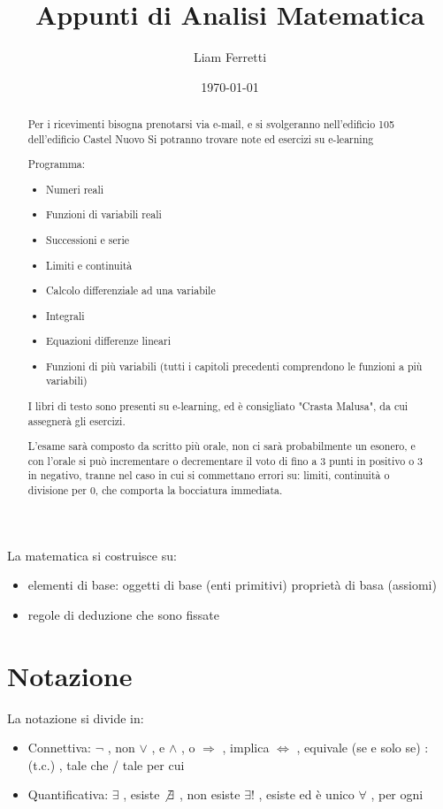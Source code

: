 \documentclass[a4paper,12pt]{article}
\title{Appunti di Analisi Matematica}
\author{Liam Ferretti}
\date{\today}
\begin{document}
	
	\maketitle
	
	\begin{abstract}
		Per i ricevimenti bisogna prenotarsi via e-mail, e si svolgeranno nell'edificio 105 dell'edificio Castel Nuovo
		Si potranno trovare note ed esercizi su e-learning
		
		Programma:
		\begin{itemize}
		\item Numeri reali  
		\item Funzioni di variabili reali  
		\item Successioni e serie
		\item Limiti e continuità
		\item Calcolo differenziale ad una variabile  
		\item Integrali
		\item Equazioni differenze lineari  
		\item Funzioni di più variabili (tutti i capitoli precedenti comprendono le funzioni a più variabili)
		\end{itemize}
		I libri di testo sono presenti su e-learning, ed è consigliato "Crasta Malusa", da cui assegnerà gli esercizi.
		
		L'esame sarà composto da scritto più orale, non ci sarà probabilmente un esonero, e con l'orale si può incrementare o decrementare il voto di fino a 3 punti in positivo o 3 in negativo, tranne nel caso in cui si commettano errori su: limiti, continuità o divisione per 0, che comporta la bocciatura immediata.
	\end{abstract}
	
	\newpage
	\tableofcontents
	\clearpage
	La matematica si costruisce su:
	\begin{itemize}
		\item elementi di base:
			\subitem oggetti di base (enti primitivi)
			\subitem proprietà di basa (assiomi)
		\item regole di deduzione che sono fissate
	\end{itemize}
	
	\section{Notazione}
	
	La notazione si divide in:
	\begin{itemize}
		\item Connettiva:
			\subitem $\neg$ , non
			\subitem $\vee$ ,  e
			\subitem $\wedge$ , o
			\subitem $\Rightarrow$ , implica 
			\subitem $\iff$ , equivale (se e solo se)
			\subitem : (t.c.) , tale che / tale per cui
		\item Quantificativa:
			\subitem $\exists$ , esiste
			\subitem $\not \exists$ , non esiste
			\subitem $\exists!$ , esiste ed è unico
			\subitem $\forall$ , per ogni
	\end{itemize}
	
\end{document}
